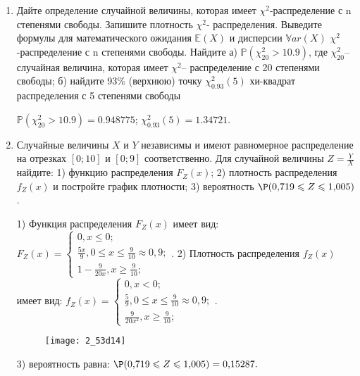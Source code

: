 \documentclass[a4paper,12pt]{article}
\begin{document}
\begin{enumerate}


\item


Дайте определение случайной величины, которая имеет $\chi ^{2}$-распределение с n степенями свободы.
Запишите плотность $\chi ^{2}$- распределения. Выведите формулы для математического ожидания $\mathbb{E}(X)$ и дисперсии $\mathbb{V}ar(X)$ $\chi ^{2}$-распределение с n степенями свободы. Найдите а) $\mathbb{P}(\chi _{20}^{2} > 10.9)$, где $\chi _{20}^{2}$–случайная величина, которая имеет $\chi ^{2}$– распределение с 20 степенями свободы; б) найдите 93\%
(верхнюю) точку $\chi _{0.93}^{2} (5)$ хи-квадрат распределения с 5 степенями свободы




$\mathbb{P}(\chi _{20}^{2} > 10.9) =  0.948775$; $\chi _{0.93}^{2} (5) = 1.34721$.


\item



Случайные величины $X$ и $Y$ независимы и имеют равномерное
распределение на отрезках $[0;10]$ и $[0;9]$ соответственно. Для случайной величины $Z=\frac{Y}{X}$ найдите: 
1) функцию распределения $F_Z(x)$;
2) плотность распределения $f_Z(x)$ и постройте график плотности;
3) вероятность $\P(0,\!719\leqslant Z\leqslant 1,\!005)$.




1) Функция распределения $F_Z(x)$ имеет вид:
$
F_Z(x)=\left\{
\begin{array}{l}
0, x\leqslant 0;\\
\frac{5 x}{9}, 0\leqslant x\leqslant \frac{9}{10}\approx 0,\!9;\\
1 - \frac{9}{20 x}, x\geqslant\frac{9}{10};
\end{array}.
\right.
$
2) Плотность распределения $f_Z(x)$ имеет вид:
$
f_Z(x)=\left\{
\begin{array}{l}
0, x<0;\\
\frac{5}{9}, 0\leqslant x\leqslant \frac{9}{10}\approx 0,\!9;\\
\frac{9}{20 x^{2}}, x\geqslant\frac{9}{10};
\end{array}.
\right.
$


\begin{figure}[H]
    \texttt{[image: 2\_53d14]}
\end{figure}


3) вероятность равна:
$
\P(0,\!719\leqslant Z\leqslant 1,\!005)=
0,\!15287.
$



\end{enumerate}
\end{document}
